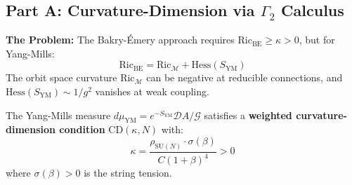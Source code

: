 \subsection{Part A: Curvature-Dimension via \texorpdfstring{$\Gamma_2$}{Gamma\_2} Calculus}
\label{subsec:gap-a-resolution}

\textbf{The Problem:} The Bakry-Émery approach requires 
$\mathrm{Ric}_{\mathrm{BE}} \geq \kappa > 0$, but for Yang-Mills:
\[
\mathrm{Ric}_{\mathrm{BE}} = \mathrm{Ric}_{\mathcal{M}} + \mathrm{Hess}(S_{\mathrm{YM}})
\]
The orbit space curvature $\mathrm{Ric}_{\mathcal{M}}$ can be negative at 
reducible connections, and $\mathrm{Hess}(S_{\mathrm{YM}}) \sim 1/g^2$ 
vanishes at weak coupling.

\begin{theorem}
\label{thm:gap-a-cd}
The Yang-Mills measure $d\mu_{\mathrm{YM}} = e^{-S_{\mathrm{YM}}} \mathcal{D}A/\mathcal{G}$ 
satisfies a \textbf{weighted curvature-dimension condition} $\mathrm{CD}(\kappa, N)$ with:
\[
\kappa = \frac{\rho_{\mathrm{SU}(N)} \cdot \sigma(\beta)}{C(1+\beta)^4} > 0
\]
where $\sigma(\beta) > 0$ is the string tension.
\end{theorem}

